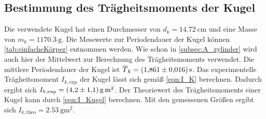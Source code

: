 \subsection{Bestimmung des Trägheitsmoments der Kugel}
\label{subsec:A_kugel}
Die verwendete Kugel hat einen Durchmesser von $d_k = \qty{14.72}{\centi\metre}$ und eine Masse von $m_k = \qty{1170.3}{\gram}$. Die Messwerte zur Periodendauer der Kugel
können \autoref{tab:einfacheKörper} entnommen werden. Wie schon in \autoref{subsec:A_zylinder} wird auch hier der Mittelwert zur Berechnung des Trägheitsmoments
verwendet. Die mittlere Periodendauer der Kugel ist $\overline{T}_k = \qty{1.861+-0.016}{\second}$. Das experimentelle Trägheitsmoment $I_{k,\text{exp}}$ der Kugel 
lässt sich gemäß \autoref{eqn:I_K} berechnen. Dadurch ergibt sich $I_{k,\text{exp}} = \qty{4.2+-1.1}{\gram\metre\squared}$. Der Theoriewert des Trägheitsmoments einer Kugel
kann durch \autoref{eqn:I_Kugel} berechnen.
Mit den gemessenen Größen ergibt sich $I_{k,\text{theo}} = \qty{2.53}{\gram\metre\squared}$. 

